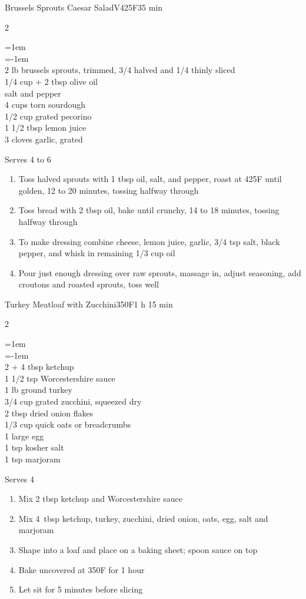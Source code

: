 \documentclass{article}
\newenvironment{recipe}[3][]
    {\begin{cardbase}[#1]{#2}{#3}
    \columnratio{0.333}
    \begin{paracol}{2}}
    {\end{paracol}\end{cardbase}}
\newenvironment{denserecipe}[3][]
    {\small
    \begin{recipe}[#1]{#2}{#3}}
    {\end{recipe}}
\newcommand{\nextcolumn}{\switchcolumn}
\newenvironment{ingredients}
    {
    \begin{obeylines}
    \vspace{\parskip}
    \setlength{\parskip}{0.25em}
    \vspace{-0.25em}
    \leftskip=1em
    \parindent=-1em}
    {\end{obeylines}}
\newenvironment{steps}
    {\begin{enumerate}[leftmargin=*,topsep=0pt]}
    {\end{enumerate}}
\newcommand{\fahrenheit}[1]{#1\textdegree{}F}
\newcommand{\tag}[1]{\hspace{1em}#1}
\newcommand{\symboltag}[2]{\tag{#1\hspace{0.4em}#2}}
\newcommand{\totaltime}[1]{\symboltag{\raisebox{-0.1em}{\small\StopWatchEnd}}{#1}}
\newcommand{\preheat}[1]{\symboltag{\Topbottomheat}{#1}}
\begin{document}
\begin{denserecipe}{Brussels Sprouts Caesar Salad}{\tag{V}\preheat{\fahrenheit{425}}\totaltime{35 min}}
\begin{ingredients}
2 lb brussels sprouts, trimmed, 3/4 halved and 1/4 thinly sliced
1/4 cup + 2 tbsp olive oil
salt and pepper
4 cups torn sourdough
1/2 cup grated pecorino
1 1/2 tbsp lemon juice
3 cloves garlic, grated
\end{ingredients}
\nextcolumn
Serves 4 to 6
\begin{steps}
\item Toss halved sprouts with 1 tbsp oil, salt, and pepper, roast at \fahrenheit{425} until golden, 12 to 20 minutes, tossing halfway through
\item Toss bread with 2 tbsp oil, bake until crunchy, 14 to 18 minutes, tossing halfway through
\item To make dressing combine cheese, lemon juice, garlic, 3/4 tsp salt, black pepper, and whisk in remaining 1/3 cup oil
\item Pour just enough dressing over raw sprouts, massage in, adjust seasoning, add croutons and roasted sprouts, toss well
\end{steps}
\end{denserecipe}

\begin{denserecipe}{Turkey Meatloaf with Zucchini}{\preheat{\fahrenheit{350}}\totaltime{1 h 15 min}}
\begin{ingredients}
2 + 4 tbsp ketchup
1 1/2 tsp Worcestershire sauce
1 lb ground turkey
3/4 cup grated zucchini, squeezed dry
2 tbsp dried onion flakes
1/3 cup quick oats or breadcrumbs
1 large egg
1 tsp kosher salt
1 tsp marjoram
\end{ingredients}
\nextcolumn
Serves 4
\begin{steps}
\item Mix 2 tbsp ketchup and Worcestershire sauce
\item Mix 4~tbsp ketchup, turkey, zucchini, dried onion, oats, egg, salt and marjoram
\item Shape into a loaf and place on a baking sheet; spoon sauce on top
\item Bake uncovered at \fahrenheit{350} for 1 hour
\item Let sit for 5 minutes before slicing
\end{steps}
\end{denserecipe}
\end{document}
